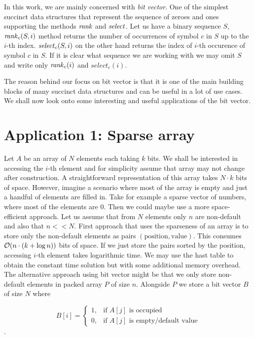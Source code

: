 In this work, we are mainly concerned with \textit{bit vector}. One of the simplest
succinct data structures that represent the sequence of zeroes and ones supporting
the methods $\mathit{rank}$ and $\mathit{select}$. Let us have a binary sequence $S$, $\mathit{rank}_c(S, i)$
method returns the number of occurrences of symbol $c$ in $S$ up to the $i$-th index.
$\mathit{select}_c(S, i)$ on the other hand returns the index of $i$-th occurence of symbol $c$
in $S$. If it is clear what sequence we are working with we may omit $S$ and write only
$\mathit{rank}_c(i)$ and $select_c(i)$.

The reason behind our focus on bit vector is that it is one of the main building blocks of
many succinct data structures and can be useful in a lot of use cases. We shall now look
onto some interesting and useful applications of the bit vector.


\section{Application 1: Sparse array}

Let $A$ be an array of $N$ elements each taking $k$ bits. We shall be interested in
accessing the $i$-th element and for simplicity assume that array may not change
after construction. A straightforward representation of this array takes $N\cdot k$
bits of space. However, imagine a scenario where most of the array is empty and just a handful
of elements are filled in. Take for example a sparse vector of numbers, where most of the
elements are 0. Then we could maybe use a more space-efficient approach. Let us assume that
from $N$ elements only $n$ are non-default and also that $n<<N$. First approach
that uses the sparseness of an array is to store only the non-default elements as
pairs $(\text{position}, \text{value})$. This consumes $\mathcal{O}(n\cdot (k+\log n))$ bits of space.
If we just store the pairs sorted by the position, accessing $i$-th element takes logarithmic
time. We may use the hast table to obtain the constant time solution but with some additional
memory overhead. The alternative approach using bit vector might be that we only store non-default
elements in packed array $P$ of size $n$. Alongside $P$ we store a bit vector $B$ of size $N$ where

\[
   B[i]=
\begin{cases}
   1,& \text{if $A[j]$ is occupied} \\
   0,& \text{if $A[j]$ is empty/default value}
\end{cases}
\].


